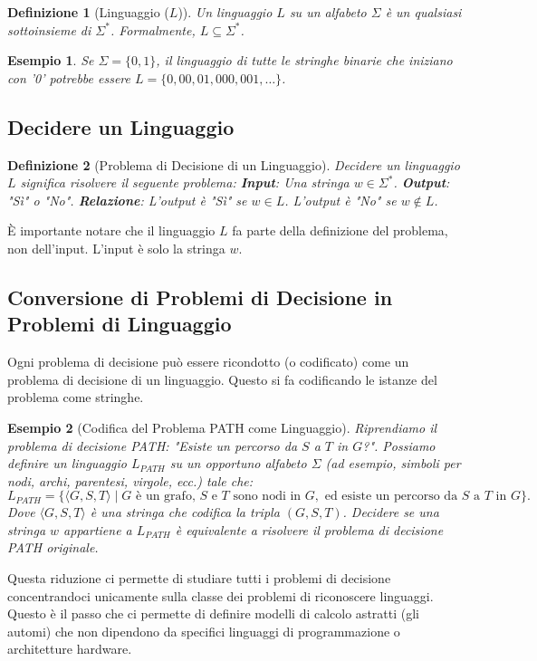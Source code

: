 \documentclass[a4paper]{article}
\newtheorem{definition}{Definizione}
\newtheorem{example}{Esempio}
\begin{document}
\begin{definition}[Linguaggio ($L$)]
Un linguaggio $L$ su un alfabeto $\Sigma$ è un qualsiasi sottoinsieme di $\Sigma^*$.
Formalmente, $L \subseteq \Sigma^*$.
\end{definition}
\begin{example}
Se $\Sigma = \{0, 1\}$, il linguaggio di tutte le stringhe binarie che iniziano con '0' potrebbe essere $L = \{0, 00, 01, 000, 001, \ldots\}$.
\end{example}

\subsection{Decidere un Linguaggio}

\begin{definition}[Problema di Decisione di un Linguaggio]
Decidere un linguaggio $L$ significa risolvere il seguente problema:
\textbf{Input}: Una stringa $w \in \Sigma^*$.
\textbf{Output}: "Sì" o "No".
\textbf{Relazione}: L'output è "Sì" se $w \in L$. L'output è "No" se $w \notin L$.
\end{definition}
È importante notare che il linguaggio $L$ fa parte della definizione del problema, non dell'input. L'input è solo la stringa $w$.

\subsection{Conversione di Problemi di Decisione in Problemi di Linguaggio}
Ogni problema di decisione può essere ricondotto (o codificato) come un problema di decisione di un linguaggio. Questo si fa codificando le istanze del problema come stringhe.

\begin{example}[Codifica del Problema PATH come Linguaggio]
Riprendiamo il problema di decisione PATH: "Esiste un percorso da $S$ a $T$ in $G$?".
Possiamo definire un linguaggio $L_{PATH}$ su un opportuno alfabeto $\Sigma$ (ad esempio, simboli per nodi, archi, parentesi, virgole, ecc.) tale che:
\[L_{PATH} = \{ \langle G, S, T \rangle \mid G \text{ è un grafo, } S \text{ e } T \text{ sono nodi in } G, \text{ ed esiste un percorso da } S \text{ a } T \text{ in } G \}.\]
Dove $\langle G, S, T \rangle$ è una stringa che codifica la tripla $(G, S, T)$.
Decidere se una stringa $w$ appartiene a $L_{PATH}$ è equivalente a risolvere il problema di decisione PATH originale.
\end{example}
Questa riduzione ci permette di studiare tutti i problemi di decisione concentrandoci unicamente sulla classe dei problemi di riconoscere linguaggi. Questo è il passo che ci permette di definire modelli di calcolo astratti (gli automi) che non dipendono da specifici linguaggi di programmazione o architetture hardware.
\end{document}

